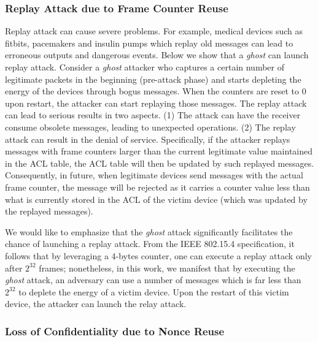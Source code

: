 \documentclass[10pt,journal,cspaper,compsoc]{IEEEtran}
\begin{document}
\subsubsection{Replay Attack due to Frame Counter Reuse}\label{sec:replayattack:reuse}
Replay attack can cause severe problems. For example, medical devices such as fitbits, pacemakers and insulin pumps which replay old messages can lead to erroneous outputs and dangerous events. Below we show that a {\em ghost} can launch replay attack. Consider a {\em ghost} attacker who captures  a certain number of legitimate packets in the beginning (pre-attack phase) and starts depleting the energy of the devices through bogus messages. When the counters are reset to 0 upon restart, the attacker can start replaying those messages. The replay attack can lead to serious results in two aspects. (1) The attack can have the receiver consume obsolete messages, leading to unexpected operations. (2) The replay attack can result in the denial of service. Specifically, if the attacker replays messages with frame counters larger than the current legitimate value maintained in the ACL table, the ACL table will then be updated by such replayed messages. Consequently, in future, when legitimate devices send messages with the actual frame counter, the message will be rejected as it carries a counter value less than what is currently stored in the ACL of the victim device (which was updated by the replayed messages).

We would like to emphasize that the {\em ghost} attack significantly facilitates the chance of launching a replay attack. From the IEEE 802.15.4 specification, it follows that by leveraging a 4-bytes counter, one can execute a replay attack only after $2^{32}$ frames; nonetheless, in this work, we manifest that by executing the {\em ghost} attack, an adversary can use a number of messages which is far less than $2^{32}$ to deplete the energy of a victim device. Upon the restart of this victim device, the attacker can launch the relay attack.

\subsubsection{Loss of Confidentiality due to Nonce Reuse}
\end{document}
